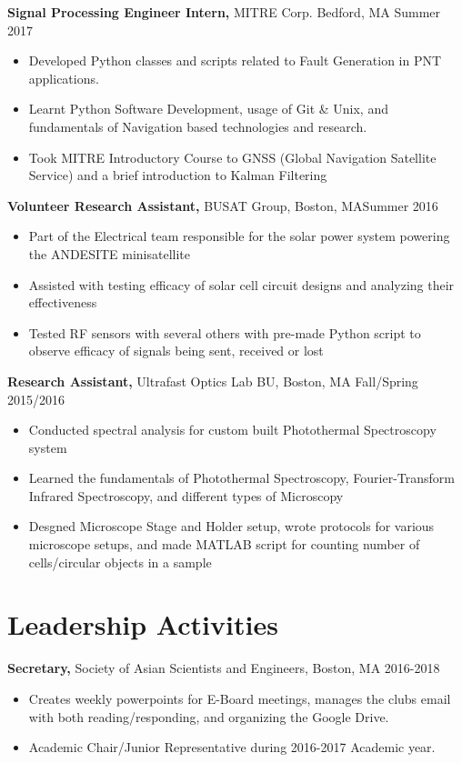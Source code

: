 \documentclass[margin]{res}
\begin{document}
\begin{resume}
 {\bf Signal Processing Engineer Intern,} MITRE Corp. Bedford, MA \hfill Summer 2017
 \begin{itemize}  pt  %
 \item Developed Python classes and scripts related to Fault Generation in PNT applications.
 \item Learnt Python Software Development, usage of Git \& Unix, and fundamentals of Navigation based technologies and research.
 \item Took MITRE Introductory Course to GNSS (Global Navigation Satellite Service) and a brief introduction to Kalman Filtering
 \end{itemize}

 
 
{\bf Volunteer Research Assistant,} BUSAT Group, Boston, MA\hfill  Summer 2016
\begin{itemize} \itemsep -0.1pt %
\item Part of the Electrical team responsible for the solar power system powering the ANDESITE minisatellite
\item Assisted with testing efficacy of solar cell circuit designs and analyzing their effectiveness 
\item Tested RF sensors with several others with pre-made Python script to observe efficacy of signals being sent, received or lost
\end{itemize}


{\bf Research Assistant,} Ultrafast Optics Lab BU, Boston, MA \hfill Fall/Spring 2015/2016
			\begin{itemize} \itemsep -2pt
			\item  Conducted spectral analysis for custom built Photothermal Spectroscopy system
			\item Learned the fundamentals of Photothermal Spectroscopy, Fourier-Transform Infrared Spectroscopy, and different types of Microscopy 
			\item Desgned Microscope Stage and Holder setup, wrote protocols for various microscope setups, and made MATLAB script for counting number of cells/circular objects in a sample
			\end{itemize}
\section{Leadership   Activities} 
               {\bf Secretary,} Society of Asian Scientists and Engineers, Boston, MA    \hfill         2016-2018
                \begin{itemize} \itemsep -0.5pt
                \item Creates weekly powerpoints for E-Board meetings, manages the clubs email with both reading/responding, and organizing the Google Drive.
              \item Academic Chair/Junior Representative during 2016-2017 Academic year.


\end{itemize}
\end{resume}
\end{document}
